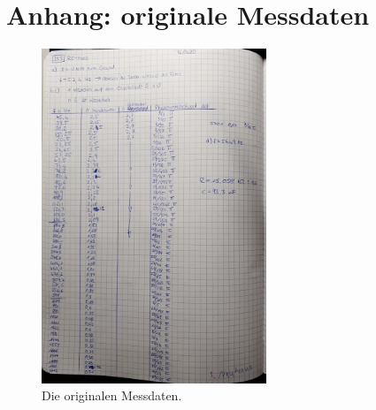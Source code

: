 \FloatBarrier
\section*{Anhang: originale Messdaten}
\label{sec:Anhang}
\begin{figure}
    \centering
    \includegraphics[width=0.6\textwidth]{plots/Anhang.jpeg}
    \caption{Die originalen Messdaten.}
\end{figure}